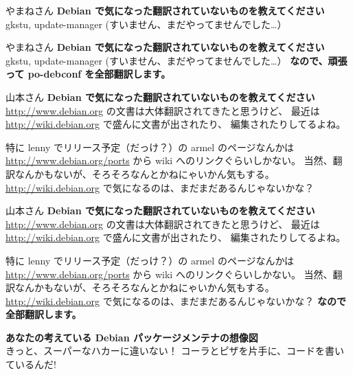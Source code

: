 \documentclass[cjk,dvipdfmx,12pt]{beamer}
\begin{document}
\begin{frame}{やまねさん}
\textbf{Debian で気になった翻訳されていないものを教えてください}\\
gkstu, update-manager (すいません、まだやってませんでした…）

\end{frame}

\begin{frame}{やまねさん}
\textbf{Debian で気になった翻訳されていないものを教えてください}\\
gkstu, update-manager (すいません、まだやってませんでした…）
\textbf{なので、頑張って po-debconf を全部翻訳します。}
\end{frame}

\begin{frame}{山本さん}
\textbf{Debian で気になった翻訳されていないものを教えてください}\\
\url{http://www.debian.org} の文書は大体翻訳されてきたと思うけど、
最近は \url{http://wiki.debian.org} で盛んに文書が出されたり、
編集されたりしてるよね。

特に lenny でリリース予定（だっけ？）の armel のページなんかは
\url{http://www.debian.org/ports} から wiki へのリンクぐらいしかない。
当然、翻訳なんかもないが、そろそろなんとかねにゃいかん気もする。
\url{http://wiki.debian.org} で気になるのは、まだまだあるんじゃないかな？
\end{frame}

\begin{frame}{山本さん}
\textbf{Debian で気になった翻訳されていないものを教えてください}\\
\url{http://www.debian.org} の文書は大体翻訳されてきたと思うけど、
最近は \url{http://wiki.debian.org} で盛んに文書が出されたり、
編集されたりしてるよね。

特に lenny でリリース予定（だっけ？）の armel のページなんかは
\url{http://www.debian.org/ports} から wiki へのリンクぐらいしかない。
当然、翻訳なんかもないが、そろそろなんとかねにゃいかん気もする。
\url{http://wiki.debian.org} で気になるのは、まだまだあるんじゃないかな？
\textbf{なので全部翻訳します。}
\end{frame}

\begin{frame}
\textbf{あなたの考えている Debian パッケージメンテナの想像図}\\
きっと、スーパーなハカーに違いない！
コーラとピザを片手に、コードを書いているんだ!
\end{frame}
\end{document}
